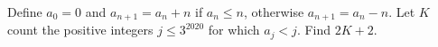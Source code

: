 Define $a_0=0$ and $a_{n+1}=a_n+n$ if $a_n\le n$, otherwise $a_{n+1}=a_n-n$. Let $K$ count the positive integers $j\le3^{2020}$ for which $a_j<j$. Find $2K+2$.
